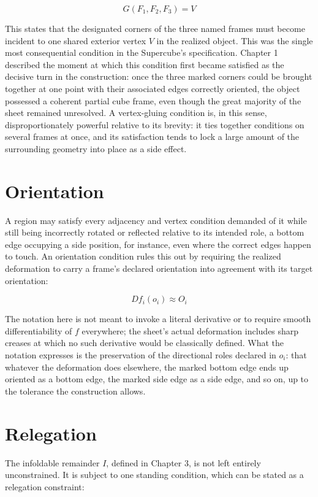 \documentclass[11pt,oneside]{book}
\begin{document}
\[G(F_1, F_2, F_3) = V\]

This states that the designated corners of the three named frames must
become incident to one shared exterior vertex \(V\) in the realized
object. This was the single most consequential condition in the
Supercube's specification. Chapter 1 described the moment at which this
condition first became satisfied as the decisive turn in the
construction: once the three marked corners could be brought together at
one point with their associated edges correctly oriented, the object
possessed a coherent partial cube frame, even though the great majority
of the sheet remained unresolved. A vertex-gluing condition is, in this
sense, disproportionately powerful relative to its brevity: it ties
together conditions on several frames at once, and its satisfaction
tends to lock a large amount of the surrounding geometry into place as a
side effect.

\hypertarget{orientation}{%
\section{Orientation}\label{orientation}}

A region may satisfy every adjacency and vertex condition demanded of it
while still being incorrectly rotated or reflected relative to its
intended role, a bottom edge occupying a side position, for instance,
even where the correct edges happen to touch. An orientation condition
rules this out by requiring the realized deformation to carry a frame's
declared orientation into agreement with its target orientation:

\[D f_i(o_i) \approx O_i\]

The notation here is not meant to invoke a literal derivative or to
require smooth differentiability of \(f\) everywhere; the sheet's actual
deformation includes sharp creases at which no such derivative would be
classically defined. What the notation expresses is the preservation of
the directional roles declared in \(o_i\): that whatever the deformation
does elsewhere, the marked bottom edge ends up oriented as a bottom
edge, the marked side edge as a side edge, and so on, up to the
tolerance the construction allows.

\hypertarget{relegation}{%
\section{Relegation}\label{relegation}}

The infoldable remainder \(I\), defined in Chapter 3, is not left
entirely unconstrained. It is subject to one standing condition, which
can be stated as a relegation constraint:
\end{document}
